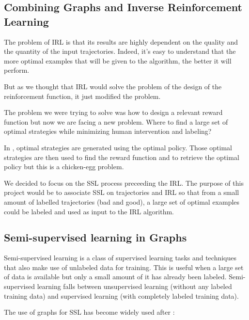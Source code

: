 \documentclass{article}
\begin{document}
\subsection{Combining Graphs and Inverse Reinforcement Learning}

The problem of IRL is that its results are highly dependent on the quality and the quantity of the input trajectories. Indeed, it's easy to understand that the more optimal examples that will be given to the algorithm, the better it will perform.

But as we thought that IRL would solve the problem of the design of the reinforcement function, it just modified the problem.

The problem we were trying to solve was how to design a relevant reward function but now we are facing a new problem. Where to find a large set of optimal strategies while minimizing human intervention and labeling?

In \cite{Ng00}, optimal strategies are generated using the optimal policy. Those optimal strategies are then used to find the reward function and to retrieve the optimal policy but this is a chicken-egg problem.

We decided to focus on the SSL process preceeding the IRL. The purpose of this project would be to associate SSL on trajectories and IRL so that from a small amount of labelled trajectories (bad and good), a large set of optimal examples could be labeled and used as input to the IRL algorithm.

\subsection{Semi-supervised learning in Graphs}


Semi-supervised learning is a class of supervised learning tasks and techniques that also make use of unlabeled data for training. This is useful when a large set of data is available but only a small amount of it has already been labeled. Semi-supervised learning falls between unsupervised learning (without any labeled training data) and supervised learning (with completely labeled training data).

The use of graphs for SSL has become widely used after : \cite{Zhu03}
\end{document}
